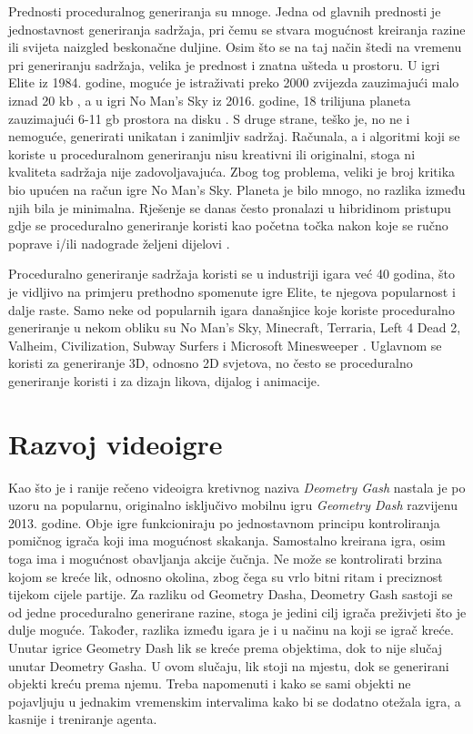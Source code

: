 \documentclass[]{foi} %
\begin{document}
Prednosti proceduralnog generiranja su mnoge. Jedna od glavnih prednosti je jednostavnost generiranja sadržaja, pri čemu se stvara mogućnost kreiranja razine ili svijeta naizgled beskonačne duljine. Osim što se na taj način štedi na vremenu pri generiranju sadržaja, velika je prednost i znatna ušteda u prostoru. U igri Elite iz 1984. godine, moguće je istraživati preko 2000 zvijezda zauzimajući malo iznad 20 kb \cite[str. 4]{Blomberg2018AnEO}, a u igri No Man's Sky iz 2016. godine, 18 trilijuna planeta zauzimajući 6-11 gb prostora na disku \cite{noSky}. S druge strane, teško je, no ne i nemoguće, generirati unikatan i zanimljiv sadržaj. Računala, a i algoritmi koji se koriste u proceduralnom generiranju nisu kreativni ili originalni, stoga ni kvaliteta sadržaja nije zadovoljavajuća. Zbog tog problema, veliki je broj kritika bio upućen na račun igre No Man's Sky. Planeta je bilo mnogo, no razlika između njih bila je minimalna. Rješenje se danas često pronalazi u hibridinom pristupu gdje se proceduralno generiranje koristi kao početna točka nakon koje se ručno poprave i/ili nadograde željeni dijelovi \cite{hibrid}.

Proceduralno generiranje sadržaja koristi se u industriji igara već 40 godina, što je vidljivo na primjeru prethodno spomenute igre Elite, te njegova popularnost i dalje raste. Samo neke od popularnih igara današnjice koje koriste proceduralno generiranje u nekom obliku su No Man's Sky, Minecraft, Terraria, Left 4 Dead 2, Valheim, Civilization, Subway Surfers i Microsoft Minesweeper \cite[str. 670]{AIforGames}. Uglavnom se koristi za generiranje 3D, odnosno 2D svjetova, no često se proceduralno generiranje koristi i za dizajn likova, dijalog i animacije.

\section{Razvoj videoigre}
Kao što je i ranije rečeno videoigra kretivnog naziva \textit{Deometry Gash} nastala je po uzoru na popularnu, originalno isključivo mobilnu igru \textit{Geometry Dash} razvijenu 2013. godine. Obje igre funkcioniraju po jednostavnom principu kontroliranja pomičnog igrača koji ima mogućnost skakanja. Samostalno kreirana igra, osim toga ima i mogućnost obavljanja akcije čučnja. Ne može se kontrolirati brzina kojom se kreće lik, odnosno okolina, zbog čega su vrlo bitni ritam i preciznost tijekom cijele partije. Za razliku od Geometry Dasha, Deometry Gash sastoji se od jedne proceduralno generirane razine, stoga je jedini cilj igrača preživjeti što je dulje moguće. Također, razlika između igara je i u načinu na koji se igrač kreće. Unutar igrice Geometry Dash lik se kreće prema objektima, dok to nije slučaj unutar Deometry Gasha. U ovom slučaju, lik stoji na mjestu, dok se generirani objekti kreću prema njemu. Treba napomenuti i kako se sami objekti ne pojavljuju u jednakim vremenskim intervalima kako bi se dodatno otežala igra, a kasnije i treniranje agenta.
\end{document}
